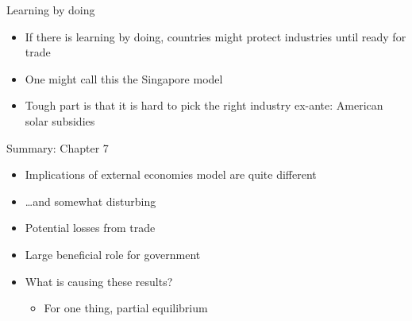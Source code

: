 \documentclass[ignorenonframetext,]{beamer}
\begin{document}
\begin{frame}{Learning by doing}

    \begin{itemize}
        \item If there is learning by doing, countries might protect industries until ready for trade
        \item One might call this the Singapore model
        \item Tough part is that it is hard to pick the right industry ex-ante: American solar subsidies
    \end{itemize}

\end{frame}

\begin{frame}{Summary: Chapter 7}

    \begin{itemize}
        \item Implications of external economies model are quite different
        \item \dots and somewhat disturbing
        \item Potential losses from trade
        \item Large beneficial role for government
        \item What is causing these results?
        \begin{itemize}
            \item For one thing, partial equilibrium
        \end{itemize}
    \end{itemize}

\end{frame}
\end{document}
